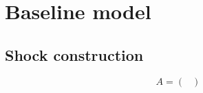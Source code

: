 
\section{Baseline model}
\label{sec:baseline_model}

\subsection{Shock construction}
\label{sec:shock_construction}



\begin{equation}
    A =
    \begin{pmatrix}
        
    \end{pmatrix}
\end{equation}